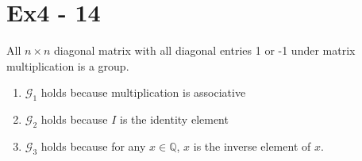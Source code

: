 \section*{Ex4 - 14}
All $ n \times n $ diagonal matrix with all diagonal entries 1 or -1 under matrix multiplication is a group.
\begin{enumerate}
    \item {$ \mathscr{G}_1 $ holds because multiplication is associative}
    \item {$ \mathscr{G}_2 $ holds because $ I $ is the identity element}
    \item {$ \mathscr{G}_3 $ holds because for any $ x \in \mathbb{Q} $, $ x $ is the inverse element of $ x $.}
\end{enumerate}